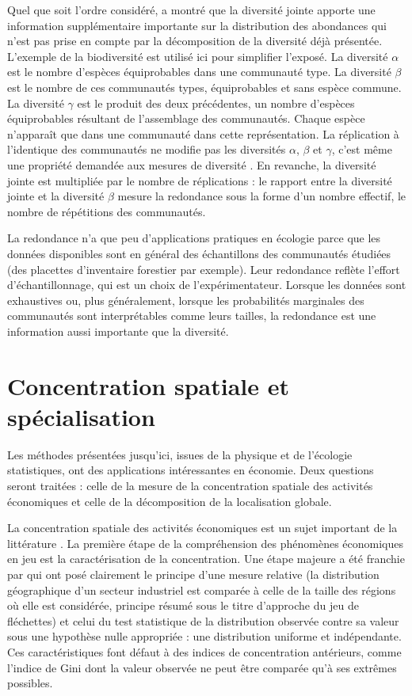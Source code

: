 \documentclass[fleqn,10pt]{ArtEcoFoG} %
\begin{document}
Quel que soit l'ordre considéré, \citet{Gregorius2010} a montré que la
diversité jointe apporte une information supplémentaire importante sur
la distribution des abondances qui n'est pas prise en compte par la
décomposition de la diversité déjà présentée. L'exemple de la
biodiversité est utilisé ici pour simplifier l'exposé. La diversité
\(\alpha\) est le nombre d'espèces équiprobables dans une communauté
type. La diversité \(\beta\) est le nombre de ces communautés types,
équiprobables et sans espèce commune. La diversité \(\gamma\) est le
produit des deux précédentes, un nombre d'espèces équiprobables
résultant de l'assemblage des communautés. Chaque espèce n'apparaît que
dans une communauté dans cette représentation. La réplication à
l'identique des communautés ne modifie pas les diversités \(\alpha\),
\(\beta\) et \(\gamma\), c'est même une propriété demandée aux mesures
de diversité \citep{Hill1973}. En revanche, la diversité jointe est
multipliée par le nombre de réplications \citep{Marcon2014d}: le rapport
entre la diversité jointe et la diversité \(\beta\) mesure la redondance
sous la forme d'un nombre effectif, le nombre de répétitions des
communautés.

La redondance n'a que peu d'applications pratiques en écologie parce que
les données disponibles sont en général des échantillons des communautés
étudiées (des placettes d'inventaire forestier par exemple). Leur
redondance reflète l'effort d'échantillonnage, qui est un choix de
l'expérimentateur. Lorsque les données sont exhaustives ou, plus
généralement, lorsque les probabilités marginales des communautés sont
interprétables comme leurs tailles, la redondance est une information
aussi importante que la diversité.

\section{Concentration spatiale et
spécialisation}\label{concentration-spatiale-et-specialisation}

Les méthodes présentées jusqu'ici, issues de la physique et de
l'écologie statistiques, ont des applications intéressantes en économie.
Deux questions seront traitées : celle de la mesure de la concentration
spatiale des activités économiques et celle de la décomposition de la
localisation globale.

La concentration spatiale des activités économiques est un sujet
important de la littérature \citep{Combes2015}. La première étape de la
compréhension des phénomènes économiques en jeu est la caractérisation
de la concentration. Une étape majeure a été franchie par
\citet{Ellison1997} qui ont posé clairement le principe d'une mesure
relative (la distribution géographique d'un secteur industriel est
comparée à celle de la taille des régions où elle est considérée,
principe résumé sous le titre d'approche du jeu de fléchettes) et celui
du test statistique de la distribution observée contre sa valeur sous
une hypothèse nulle appropriée : une distribution uniforme et
indépendante. Ces caractéristiques font défaut à des indices de
concentration antérieurs, comme l'indice de Gini
\citep{Gini1912, Ceriani2012} dont la valeur observée ne peut être
comparée qu'à ses extrêmes possibles.
\end{document}
